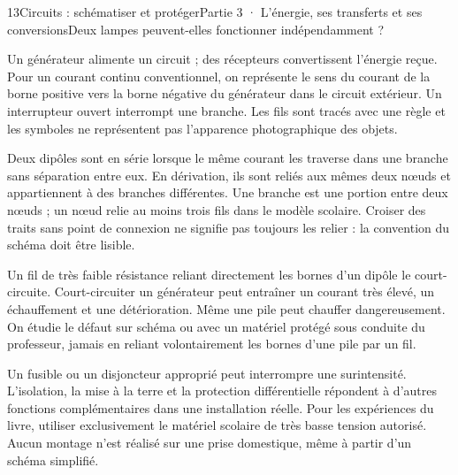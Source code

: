 \begin{ouverture}[college3]{13}{Circuits : schématiser et protéger}{Partie 3 · L’énergie, ses transferts et ses conversions}{Deux lampes peuvent-elles fonctionner indépendamment ?}
\end{ouverture}
\label{ess-13}
Un générateur alimente un circuit ; des récepteurs convertissent l’énergie reçue. Pour un courant continu conventionnel, on représente le sens du courant de la borne positive vers la borne négative du générateur dans le circuit extérieur. Un interrupteur ouvert interrompt une branche. Les fils sont tracés avec une règle et les symboles ne représentent pas l’apparence photographique des objets.\par
{}
Deux dipôles sont en série lorsque le même courant les traverse dans une branche sans séparation entre eux. En dérivation, ils sont reliés aux mêmes deux nœuds et appartiennent à des branches différentes. Une branche est une portion entre deux nœuds ; un nœud relie au moins trois fils dans le modèle scolaire. Croiser des traits sans point de connexion ne signifie pas toujours les relier : la convention du schéma doit être lisible.\par
\clearpage
{}
Un fil de très faible résistance reliant directement les bornes d’un dipôle le court-circuite. Court-circuiter un générateur peut entraîner un courant très élevé, un échauffement et une détérioration. Même une pile peut chauffer dangereusement. On étudie le défaut sur schéma ou avec un matériel protégé sous conduite du professeur, jamais en reliant volontairement les bornes d’une pile par un fil.\par
{}
Un fusible ou un disjoncteur approprié peut interrompre une surintensité. L’isolation, la mise à la terre et la protection différentielle répondent à d’autres fonctions complémentaires dans une installation réelle. Pour les expériences du livre, utiliser exclusivement le matériel scolaire de très basse tension autorisé. Aucun montage n’est réalisé sur une prise domestique, même à partir d’un schéma simplifié.\par

